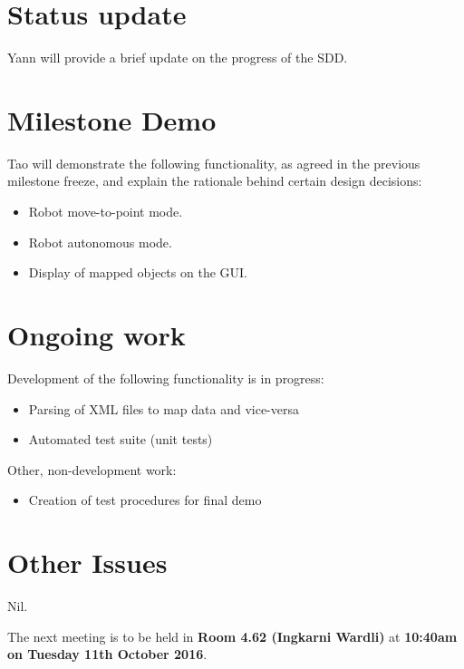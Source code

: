 \documentclass[11pt, a4paper]{article}
\begin{document}


\section{Status update}

Yann will provide a brief update on the progress of the SDD.

\section{Milestone Demo}

Tao will demonstrate the following functionality, as agreed in the previous milestone freeze, and explain the rationale behind certain design decisions:
\begin{itemize}
\item Robot move-to-point mode.
\item Robot autonomous mode.
\item Display of mapped objects on the
GUI.
\end{itemize}

\section{Ongoing work}
Development of the following functionality is in progress:

\begin{itemize}
\item Parsing of XML files to map data and vice-versa
\item Automated test suite (unit tests)
\end{itemize}

Other, non-development work:

\begin{itemize}
\item Creation of test procedures for final demo
\end{itemize}

\section{Other Issues}

Nil.



\vspace*{10pt}

\noindent The next meeting is to be held in {\bf Room 4.62 (Ingkarni Wardli)} at {\bf 10:40am on Tuesday 11th October 2016}.
\end{document}
